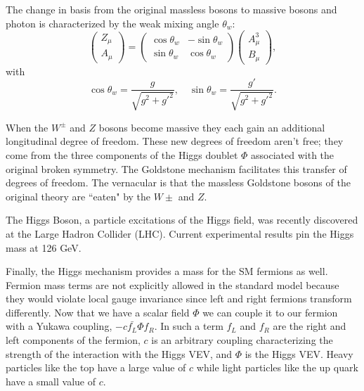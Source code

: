 The change in basis from the original massless bosons to massive bosons and photon is characterized by the weak mixing angle $\theta_w$:
\begin{equation}
  \left(\begin{matrix}Z_\mu\\A_\mu\end{matrix}\right)=\left(\begin{matrix}\cos\theta_w & -\sin\theta_w\\\sin\theta_w & \cos\theta_w\end{matrix}\right)\left(\begin{matrix}A^3_\mu\\ B_\mu\end{matrix}\right),
\end{equation}
with
\begin{equation}
  \cos\theta_w=\frac{g}{\sqrt{g^2+g'^2}},\quad\sin\theta_w=\frac{g'}{\sqrt{g^2+g'^2}}.
\end{equation}

When the $W^\pm$ and $Z$ bosons become massive they each gain an additional longitudinal degree of freedom.
These new degrees of freedom aren't free; they come from the three components of the Higgs doublet $\Phi$ associated with the original broken symmetry.
The Goldstone mechanism facilitates this transfer of degrees of freedom.
The vernacular is that the massless Goldstone bosons of the original theory are ``eaten" by the $W\pm$ and $Z$.

The Higgs Boson, a particle excitations of the Higgs field, was recently discovered at the Large Hadron Collider (LHC).
Current experimental results pin the Higgs mass at 126 GeV.

Finally, the Higgs mechanism provides a mass for the SM fermions as well.
Fermion mass terms are not explicitly allowed in the standard model because they would violate local gauge invariance since left and right fermions transform differently.
Now that we have a scalar field $\Phi$ we can couple it to our fermion with a Yukawa coupling, $-c\bar{f_L}\Phi f_R$.
In such a term $f_L$ and $f_R$ are the right and left components of the fermion, $c$ is an arbitrary coupling characterizing the strength of the interaction with the Higgs VEV, and $\Phi$ is the Higgs VEV.
Heavy particles like the top have a large value of $c$ while light particles like the up quark have a small value of $c$.



